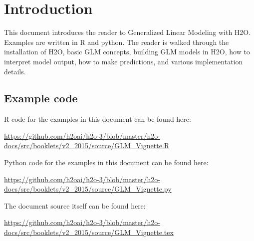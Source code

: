\newpage

\tableofcontents


\newpage

\section{Introduction}
This document introduces the reader to Generalized Linear Modeling with H2O.  Examples are written in R and python.
The reader is walked through the installation of H2O, basic GLM concepts, building GLM models in H2O, how to
interpret model output, how to make predictions, and various implementation details.





\newpage

\newcommand{\waterVersion}{3.0.1.4}


\subsection{Example code}

R code for the examples in this document can be found here:

\url{https://github.com/h2oai/h2o-3/blob/master/h2o-docs/src/booklets/v2_2015/source/GLM_Vignette.R}

Python code for the examples in this document can be found here:

\url{https://github.com/h2oai/h2o-3/blob/master/h2o-docs/src/booklets/v2_2015/source/GLM_Vignette.py}

The document source itself can be found here:

\url{https://github.com/h2oai/h2o-3/blob/master/h2o-docs/src/booklets/v2_2015/source/GLM_Vignette.tex}


